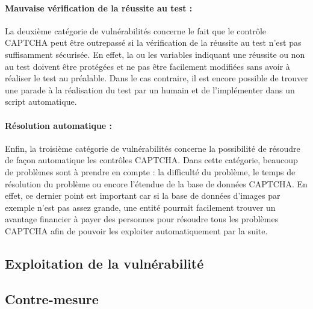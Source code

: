 \paragraph{Mauvaise vérification de la réussite au test :}

La deuxième catégorie de vulnérabilités concerne le fait que le contrôle CAPTCHA peut être outrepassé si la vérification de la réussite au test n'est pas suffisamment sécurisée. En effet, la ou les variables indiquant une réussite ou non au test doivent être protégées et ne pas être facilement modifiées sans avoir à réaliser le test au préalable. Dans le cas contraire, il est encore possible de trouver une parade à la réalisation du test par un humain et de l'implémenter dans un script automatique.

\paragraph{Résolution automatique :}

Enfin, la troisième catégorie de vulnérabilités concerne la possibilité de résoudre de façon automatique les contrôles CAPTCHA. Dans cette catégorie, beaucoup de problèmes sont à prendre en compte : la difficulté du problème, le temps de résolution du problème ou encore l'étendue de la base de données CAPTCHA. En effet, ce dernier point est important car si la base de données d'images par exemple n'est pas assez grande, une entité pourrait facilement trouver un avantage financier à payer des personnes pour résoudre tous les problèmes CAPTCHA afin de pouvoir les exploiter automatiquement par la suite.

\subsection{Exploitation de la vulnérabilité}

\subsection{Contre-mesure}








